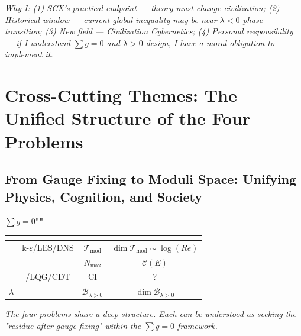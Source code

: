 \documentclass[12pt,a4paper]{article}
\theoremstyle{remark}
\newcommand{\T}{\mathcal{T}}
\newcommand{\B}{\mathcal{B}}
\begin{document}
\medskip
\noindent\textit{Why I: (1) SCX's practical endpoint — theory must change civilization; (2) Historical window — current global inequality may be near $\lambda < 0$ phase transition; (3) New field — Civilization Cybernetics; (4) Personal responsibility — if I understand $\sum g = 0$ and $\lambda > 0$ design, I have a moral obligation to implement it.}

\newpage


\section{}
\section*{Cross-Cutting Themes: The Unified Structure of the Four Problems}

\subsection{}
\subsection*{From Gauge Fixing to Moduli Space: Unifying Physics, Cognition, and Society}

$\sum g = 0$\textbf{""}

\begin{center}
\begin{tabular}{c|c|c|c}
    \toprule
    \textbf{} & \textbf{} & \textbf{} & \textbf{} \\
    \midrule
     & k-$\varepsilon$/LES/DNS & $\T_{\text{mod}}$ & $\dim \T_{\text{mod}} \sim \log(Re)$ \\
     &  & $N_{\max}$ & $\mathcal{C}(E)$ \\
     & /LQG/CDT & CI & ? \\
    $\lambda$ &  & $\B_{\lambda>0}$ & $\dim \B_{\lambda>0}$ \\
    \bottomrule
\end{tabular}
\end{center}

\medskip
\noindent\textit{The four problems share a deep structure. Each can be understood as seeking the "residue after gauge fixing" within the $\sum g = 0$ framework.}
\end{document}

